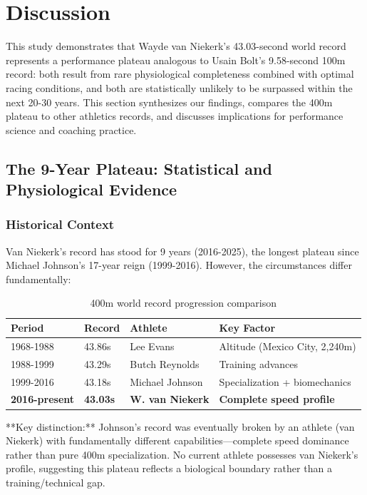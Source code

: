 \section{Discussion}

This study demonstrates that Wayde van Niekerk's 43.03-second world record represents a performance plateau analogous to Usain Bolt's 9.58-second 100m record: both result from rare physiological completeness combined with optimal racing conditions, and both are statistically unlikely to be surpassed within the next 20-30 years. This section synthesizes our findings, compares the 400m plateau to other athletics records, and discusses implications for performance science and coaching practice.

\subsection{The 9-Year Plateau: Statistical and Physiological Evidence}

\subsubsection{Historical Context}

Van Niekerk's record has stood for 9 years (2016-2025), the longest plateau since Michael Johnson's 17-year reign (1999-2016). However, the circumstances differ fundamentally:

\begin{table}[H]
\centering
\caption{400m world record progression comparison}
\begin{tabular}{@{}llll@{}}
\toprule
\textbf{Period} & \textbf{Record} & \textbf{Athlete} & \textbf{Key Factor} \\
\midrule
1968-1988 & 43.86s & Lee Evans & Altitude (Mexico City, 2,240m) \\
1988-1999 & 43.29s & Butch Reynolds & Training advances \\
1999-2016 & 43.18s & Michael Johnson & Specialization + biomechanics \\
\textbf{2016-present} & \textbf{43.03s} & \textbf{W. van Niekerk} & \textbf{Complete speed profile} \\
\bottomrule
\end{tabular}
\end{table}

**Key distinction:** Johnson's record was eventually broken by an athlete (van Niekerk) with fundamentally different capabilities—complete speed dominance rather than pure 400m specialization. No current athlete possesses van Niekerk's profile, suggesting this plateau reflects a biological boundary rather than a training/technical gap.

